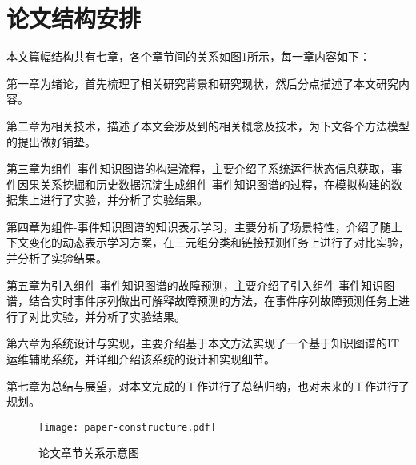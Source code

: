 \section{论文结构安排}
本文篇幅结构共有七章，各个章节间的关系如图\ref{paper-constructure}所示，每一章内容如下：

第一章为绪论，首先梳理了相关研究背景和研究现状，然后分点描述了本文研究内容。

第二章为相关技术，描述了本文会涉及到的相关概念及技术，为下文各个方法模型的提出做好铺垫。

第三章为组件-事件知识图谱的构建流程，主要介绍了系统运行状态信息获取，事件因果关系挖掘和历史数据沉淀生成组件-事件知识图谱的过程，在模拟构建的数据集上进行了实验，并分析了实验结果。

第四章为组件-事件知识图谱的知识表示学习，主要分析了场景特性，介绍了随上下文变化的动态表示学习方案，在三元组分类和链接预测任务上进行了对比实验，并分析了实验结果。

第五章为引入组件-事件知识图谱的故障预测，主要介绍了引入组件-事件知识图谱，结合实时事件序列做出可解释故障预测的方法，在事件序列故障预测任务上进行了对比实验，并分析了实验结果。

第六章为系统设计与实现，主要介绍基于本文方法实现了一个基于知识图谱的IT运维辅助系统，并详细介绍该系统的设计和实现细节。

第七章为总结与展望，对本文完成的工作进行了总结归纳，也对未来的工作进行了规划。
\begin{figure}[htbp]
    \centering
    \texttt{[image: paper-constructure.pdf]}
    \caption{论文章节关系示意图\label{paper-constructure}}
\end{figure}






